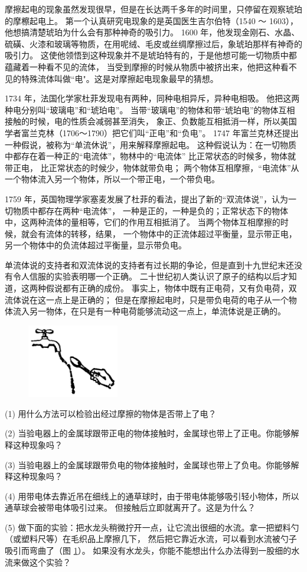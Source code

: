 摩擦起电的现象虽然发现很早，但是在长达两千多年的时间里，只停留在观察琥珀的摩檫起电上。
第一个认真研究电现象的是英国医生吉尔伯特（1540 ～ 1603），他想搞清楚琥珀为什么会有那种神奇的吸引力。
1600 年，他发现金刚石、水晶、硫磺、火漆和玻璃等物质，在用呢绒、毛皮或丝绸摩擦过后，象琥珀那样有神奇的吸引力。
这使他领悟到这种现象并不是琥珀特有的，于是他想可能一切物质中都蕴藏着一种看不见的流体，
当受到摩擦的时候从物质中被挤出来，他把这种看不见的特殊流体叫做“电"。这是对摩擦起电现象最早的猜想。

1734 年，法国化学家杜菲发现电有两种，同种电相异斥，异种电相吸。
他把这两种电分别叫“玻璃电”和“琥珀电”。
当带“玻璃电”的物体和带“琥珀电”的物体互相接触的时候，电的性质会减弱甚至消失，
象正、负数能互相抵消一样，所以美国学者富兰克林（1706～1790）把它们叫“正电”和“负电”。
1747 年富兰克林还提出一种假说，被称为“单流休说”，用来解释摩擦起电。
这种假说认为：在一切物质中都存在着一种正的“电流体”，物林中的“电流体”
比正常状态的时候多，物体就带正电，
比正常状态的时候少，物体就带负电；
两个物体互相摩擦，“电流体”从一个物体流入另一个物体，所以一个带正电，一个带负电。

1759 年，英国物理学家塞麦发展了杜菲的看法，提出了新的“双流体说”，认为一切物质中都存在两种“电流体”，
一种是正的，一种是负的；正常状态下的物体中，这两种流体的量相等，它们的作用互相抵消了。
当两个物体互相摩擦的时候，就会有流体的转移，结果，
  一个物体中的正流体超过平衡量，显示带正电，
另一个物体中的负流体超过平衡量，显示带负电。

单流体说的支持者和双流体说的支持者有过长期的争论，但是直到十九世纪末还没有令人信服的实验表明哪一个正确。
二十世纪初人类认识了原子的结构以后才知道，这两种假说都有正确的成份。
事实上，物体中既有正电荷，又有负电荷，双流体说在这一点上是正确的；
但是在摩擦起电时，只是带负电荷的电子从一个物体流入另一物体，在只是有一种电荷能够流动这一点上，单流体说是正确的。


\lianxi

\begin{figure}
    \centering
    \includegraphics[width=4cm]{../pic/czwl2-ch7-7}
    \caption{}\label{fig:7-7}
\end{figure}

(1) 用什么方法可以检验出经过摩擦的物体是否带上了电？

(2) 当验电器上的金属球跟带正电的物体接触时，金属球也带上了正电。你能够解释这种现象吗？

(3) 当验电器上的金属球跟带负电的物体接触时，金属球也带上了负电。你能够解释这种现象吗？

(4) 用带电体去靠近吊在细线上的通草球时，由于带电体能够吸引轻小物体，所以通草球会被带电体吸引过来。
但接触后立即就离开了。这是为什么？

(5) 做下面的实验：把水龙头稍微拧开一点，让它流出很细的水流。拿一把塑料勺（或塑料尺等）在毛织品上摩擦几下，
然后把它靠近水流，可以看到水流被勺子吸引而弯曲了（图 \ref{fig:7-7}）。
如果没有水龙头，你能不能想出什么办法得到一股细的水流来做这个实验？

